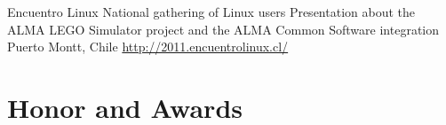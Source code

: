 \documentclass[11pt,a4paper,sans]{moderncv}
\begin{document}
        {Encuentro Linux}
        {National gathering of Linux users}
        {Presentation about the ALMA LEGO Simulator project and the ALMA Common Software integration}
        {Puerto Montt, Chile}
        {\url{http://2011.encuentrolinux.cl/}}
        
\section{Honor and Awards}

\end{document}
